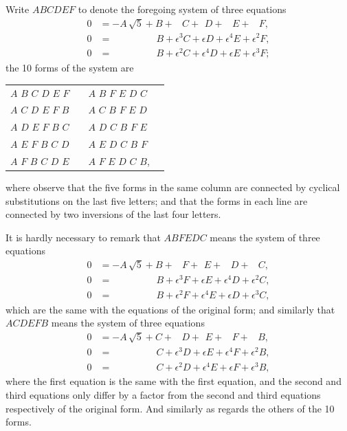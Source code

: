 \documentclass[12pt,a4paper]{article}
\theoremstyle{definition}
\begin{document}
Write $ABCDEF$ to denote the foregoing system of three equations
\begin{align*}
0 &= -A\,\sqrt{5} + B + \phantom{\epsilon^3}C + \phantom{\epsilon}D + \phantom{\epsilon^4}E + \phantom{\epsilon^2}F,\\
0 &= \phantom{-A\sqrt{5} +}\; B + \epsilon^3 C + \epsilon D + \epsilon^4 E + \epsilon^2 F,\\
0 &= \phantom{-A\sqrt{5} +}\; B + \epsilon^2 C + \epsilon^4 D + \epsilon E + \epsilon^3 F;
\end{align*}
the 10 forms of the system are

\begin{center}
\begin{tabular}{ll|ll}
$A$ $B$ $C$ $D$ $E$ $F$ & & $A$ $B$ $F$ $E$ $D$ $C$ \\
$A$ $C$ $D$ $E$ $F$ $B$ & & $A$ $C$ $B$ $F$ $E$ $D$ \\
$A$ $D$ $E$ $F$ $B$ $C$ & & $A$ $D$ $C$ $B$ $F$ $E$ \\
$A$ $E$ $F$ $B$ $C$ $D$ & & $A$ $E$ $D$ $C$ $B$ $F$ \\
$A$ $F$ $B$ $C$ $D$ $E$ & & $A$ $F$ $E$ $D$ $C$ $B$,
\end{tabular}
\end{center}

where observe that the five forms in the same column are connected by cyclical
substitutions on the last five letters; and that the forms in each line are connected
by two inversions of the last four letters.

It is hardly necessary to remark that $ABFEDC$ means the system of three equations
\begin{align*}
0 &= -A\,\sqrt{5} + B + \phantom{\epsilon^3}F + \phantom{\epsilon}E + \phantom{\epsilon^4}D + \phantom{\epsilon^2}C,\\
0 &= \phantom{-A\sqrt{5} +}\; B + \epsilon^3 F + \epsilon E + \epsilon^4 D + \epsilon^2 C,\\
0 &= \phantom{-A\sqrt{5} +}\; B + \epsilon^2 F + \epsilon^4 E + \epsilon D + \epsilon^3 C,
\end{align*}
which are the same with the equations of the original form; and similarly that
$ACDEFB$ means the system of three equations
\begin{align*}
0 &= -A\,\sqrt{5} + C + \phantom{\epsilon^3}D + \phantom{\epsilon}E + \phantom{\epsilon^4}F + \phantom{\epsilon^2}B,\\
0 &= \phantom{-A\sqrt{5} +}\; C + \epsilon^3 D + \epsilon E + \epsilon^4 F + \epsilon^2 B,\\
0 &= \phantom{-A\sqrt{5} +}\; C + \epsilon^2 D + \epsilon^4 E + \epsilon F + \epsilon^3 B,
\end{align*}
where the first equation is the same with the first equation, and the second and
third equations only differ by a factor from the second and third equations respectively
of the original form. And similarly as regards the others of the 10 forms.
\end{document}
